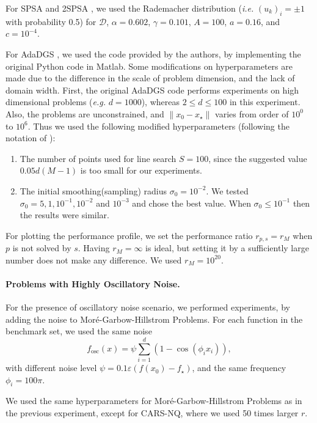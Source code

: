 For SPSA \cite{spall1992multivariate} and 2SPSA \cite{spall2000adaptive}, we used the Rademacher distribution ({\em i.e.} $(u_k)_i = \pm 1$ with probability 0.5) for $\mathcal{D}$,  $\alpha = 0.602$, $\gamma = 0.101$, $A = 100$, $a = 0.16$, and $c = 10^{-4}$.

For AdaDGS \cite{tran2020adadgs}, we used the code provided by the authors, by implementing the original Python code in Matlab. Some modifications on hyperparameters are made due to the difference in the scale of problem dimension, and the lack of domain width. First, the original AdaDGS code performs experiments on high dimensional problems  ({\em e.g.} $d=1000$), whereas $2\leq d \leq 100$ in this experiment. Also, the problems are unconstrained, and $\|x_0-x_{\star}\|$ varies from order of $10^0$ to $10^6$.
Thus we used the following modified hyperparameters (following the notation of \cite{tran2020adadgs}):
\begin{enumerate}
    \item The number of points used for line search $S = 100$, since the suggested value $0.05d(M-1)$ is too small for our experiments.
    \item The initial smoothing(sampling) radius $\sigma_0 = 10^{-2}$. We tested $\sigma_0 = 5, 1, 10^{-1}, 10^{-2}$ and $10^{-3}$ and chose the best value. When $\sigma_0 \leq 10^{-1}$ then the results were similar.
\end{enumerate}

For plotting the performance profile, we set the performance ratio $r_{p,s} = r_{M}$ when $p$ is not solved by $s$. Having $r_M = \infty$ is ideal, but setting it by a sufficiently large number does not make any difference. We used $r_M = 10^{20}$.

\paragraph{Problems with Highly Oscillatory Noise.}
For the presence of oscillatory noise scenario, we performed experiments, by adding the noise to Mor\'{e}-Garbow-Hillstrom Problems.
For each function in the benchmark set, we used the same noise
\begin{equation*}
    f_{\mathrm{osc}}(x) = \psi \sum_{i=1}^{d}(1-\cos(\phi_i x_i)), 
\end{equation*}
with different noise level $\psi = 0.1\varepsilon(f(x_0)-f_\star)$, and the same frequency $\phi_i = 100\pi$.

We used the same hyperparameters for Mor\'{e}-Garbow-Hillstrom Problems as in the previous experiment, except for CARS-NQ, where we used 50 times larger $r$.

